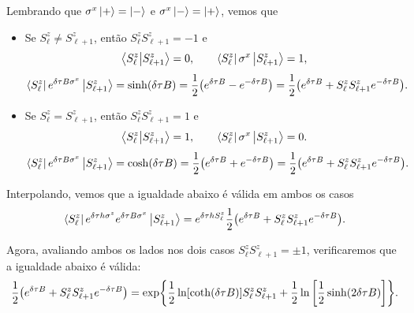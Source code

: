 \documentclass[a4paper,10pt]{article}
\begin{document}
Lembrando que $\sigma^x\ket{+} = \ket{-}$ e $\sigma^x\ket{-} = \ket{+}$, vemos que
\begin{itemize}
\item Se $S_{\ell}^z \neq S_{\ell+1}^z$, então $S_{\ell}^z S_{\ell+1}^z = -1$ e
$$
\braket{S_{\ell}^z}{S_{\ell+1}^z} = 0, \quad \quad
\bra{S_{\ell}^z} \sigma^x \ket{S_{\ell+1}^z} = 1,
$$
$$
\bra{S_{\ell}^z} e^{\delta\tau B \sigma^x} \ket{S_{\ell+1}^z} =
\sinh(\delta\tau B) =
\frac{1}{2} \qty(e^{\delta\tau B} - e^{-\delta\tau B}) =
\frac{1}{2} \qty(e^{\delta\tau B} + S_{\ell}^z S_{\ell+1}^z e^{-\delta\tau B}).
$$
\item Se $S_{\ell}^z = S_{\ell+1}^z$, então $S_{\ell}^z S_{\ell+1}^z = 1$ e
$$
\braket{S_{\ell}^z}{S_{\ell+1}^z} = 1, \quad \quad
\bra{S_{\ell}^z} \sigma^x \ket{S_{\ell+1}^z} = 0.
$$
$$
\bra{S_{\ell}^z} e^{\delta\tau B \sigma^x} \ket{S_{\ell+1}^z} =
\cosh(\delta\tau B) =
\frac{1}{2} \qty(e^{\delta\tau B} + e^{-\delta\tau B}) =
\frac{1}{2} \qty(e^{\delta\tau B} + S_{\ell}^z S_{\ell+1}^z e^{-\delta\tau B}).
$$
\end{itemize}

Interpolando, vemos que a igualdade abaixo é válida em ambos os casos
$$
\bra{S_{\ell}^z} e^{\delta\tau h \sigma^z} e^{\delta\tau B \sigma^x} \ket{S_{\ell+1}^z} =
e^{\delta\tau h S_{\ell}^z} \frac{1}{2} \qty(e^{\delta\tau B} + S_{\ell}^z S_{\ell+1}^z e^{-\delta\tau B}).
$$

\n

Agora, avaliando ambos os lados nos dois casos $S_{\ell}^z S_{\ell+1}^z = \pm 1$, verificaremos que a igualdade abaixo é válida:
\begin{equation} \label{eq:valida}
\frac{1}{2} \qty(e^{\delta\tau B} + S_{\ell}^z S_{\ell+1}^z e^{-\delta\tau B}) =
\exp{
\frac{1}{2} \ln[\coth(\delta\tau B)] S_{\ell}^z S_{\ell+1}^z +
\frac{1}{2} \ln\qty[\frac{1}{2} \sinh(2\delta\tau B)] }.
\end{equation}
\end{document}
